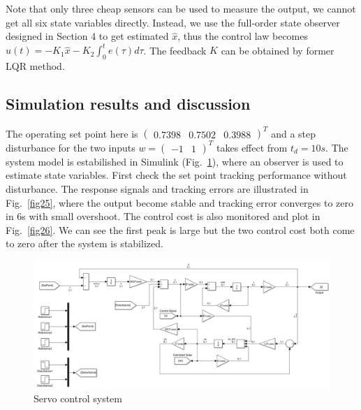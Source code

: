 \documentclass[hyperref]{article}
\theoremstyle{nonumberplain}
\begin{document}
	Note that only three cheap sensors can be used to measure the output, we cannot get all six state variables directly. Instead, we use the full-order state observer designed in Section 4 to get estimated $\hat{x}$, thus the control law becomes $u(t)=-K_{1}\hat{x}-K_{2}\int_{0}^{t}e(\tau )d\tau$. The feedback $K$ can be obtained by former LQR method.
	
	
	\subsection{Simulation results and discussion}
	
	\hspace{1.0em}
	The operating set point here is $\begin{pmatrix}
	0.7398 &0.7502  &0.3988 
	\end{pmatrix}^{T}$ and a step disturbance for the two inputs $w=\begin{pmatrix}
	-1 &1 
	\end{pmatrix}^{T}$ takes effect from $t_{d}=10s$. The system model is estabilished in Simulink (Fig.~\ref{fig24}), where an observer is used to estimate state variables. First check the set point tracking performance without disturbance. The response signals and tracking errors are illustrated in Fig.~\ref{fig25}, where the output become stable and tracking error converges to zero in 6s with small overshoot. The control cost is also monitored and plot in Fig.~\ref{fig26}. We can see the first peak is large but the two control cost both come to zero after the system is stabilized.
	
	
	\begin{figure}[H]
		\centering
		\includegraphics[width=12cm]{fig45.png}
		\caption{Servo control system}
		\label{fig24}
	\end{figure}
\end{document}
